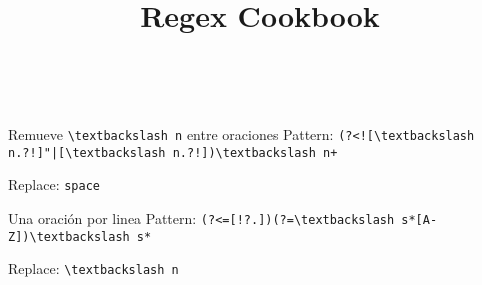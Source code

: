 \documentclass[12pt, spanish]{article}
\title{Regex Cookbook}
\author{}
\date
\begin{document}
\begin{center}{}\\
\end{center}

\begin{multicols*}{3}

\begin{roundbox}{Remueve \Verb!\textbackslash n! entre oraciones}
    Pattern: \Verb=(?<![\textbackslash n.?!]"|[\textbackslash n.?!])\textbackslash n+=

    Replace: \Verb=space=
\end{roundbox}

\begin{roundbox}{Una oración por linea}
    Pattern: \Verb|(?<=[!?.])(?=\textbackslash s*[A-Z])\textbackslash s*|

    Replace: \Verb|\textbackslash n|
\end{roundbox}

\end{multicols*} 
\end{document}
